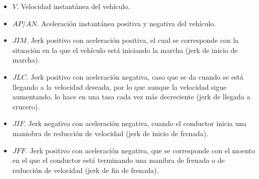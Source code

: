 \begin{itemize}
	\item $V$. Velocidad instantánea del vehículo.
	\item $AP$/$AN$. Aceleración instantánea positiva y negativa del vehículo.
	\item $JIM$. Jerk positivo con aceleración positiva, el cual se corresponde con la situación en la que el vehículo está iniciando la marcha (jerk de inicio de marcha).
	\item $JLC$. Jerk positivo con aceleración negativa, caso que se da cuando se está llegando a la velocidad deseada, por lo que aunque la velocidad sigue aumentando, lo hace en una tasa cada vez más decreciente (jerk de llegada a crucero).
	\item $JIF$. Jerk negativo con aceleración negativa, cuando el conductor inicia una maniobra de reducción de velocidad (jerk de inicio de frenada).
	\item $JFF$. Jerk positivo con aceleración negativa, que se corresponde con el moento en el que el conductor está terminando una manibra de frenada o de reducción de velocidad (jerk de fin de frenada).
\end{itemize}


